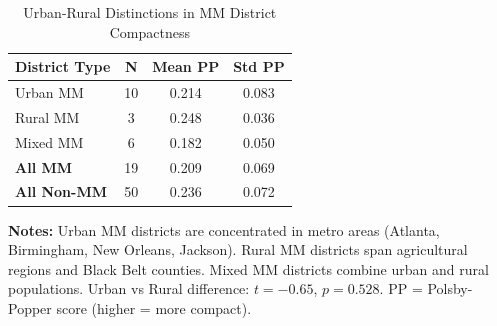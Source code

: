 \begin{table}[h]
\centering
\caption{Urban-Rural Distinctions in MM District Compactness}
\label{tab:urban_rural_comparison}
\begin{tabular}{lccc}
\hline
District Type & N & Mean PP & Std PP \\
\hline
Urban MM & 10 & 0.214 & 0.083 \\
Rural MM & 3 & 0.248 & 0.036 \\
Mixed MM & 6 & 0.182 & 0.050 \\
\hline
\textbf{All MM} & 19 & 0.209 & 0.069 \\
\textbf{All Non-MM} & 50 & 0.236 & 0.072 \\
\hline
\end{tabular}
\vspace{0.2cm}
\begin{minipage}{0.9\textwidth}
\footnotesize
\textbf{Notes:} 
Urban MM districts are concentrated in metro areas (Atlanta, Birmingham, New Orleans, Jackson). 
Rural MM districts span agricultural regions and Black Belt counties. 
Mixed MM districts combine urban and rural populations. 
Urban vs Rural difference: $t=-0.65$, $p=0.528$. 
PP = Polsby-Popper score (higher = more compact).
\end{minipage}
\end{table}